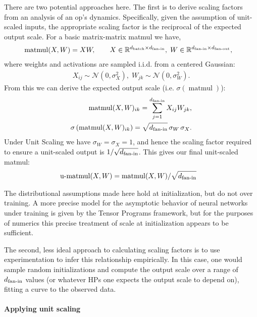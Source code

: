 There are two potential approaches here. The first is to derive scaling factors from an analysis of an op's dynamics. Specifically, given the assumption of unit-scaled inputs, the appropriate scaling factor is the reciprocal of the expected output scale. For a basic matrix-matrix matmul we have,
\begin{align*}
    &\operatorname{matmul}(X, W) = XW, \quad\quad X \in \mathbb{R}^{d_\mathrm{batch} \times d_{\mathrm{fan{\text -}in}}},\; W \in \mathbb{R}^{d_{\mathrm{fan{\text -}in}} \times d_{\mathrm{fan{\text -}out}}},
\end{align*}
where weights and activations are sampled i.i.d. from a centered Gaussian:
\begin{align*}
    X_{ij} \sim \mathcal{N}(0, \sigma_X^2), \; W_{jk} \sim \mathcal{N}(0, \sigma_W^2).
\end{align*}
From this we can derive the expected output scale (i.e. $\sigma(\operatorname{matmul})$):
\begin{align*}
    \operatorname{matmul}(X, W)_{ik} = \sum_{j=1}^{d_{\mathrm{fan{\text -}in}}} X_{ij}W_{jk},
    \\
    \sigma\left(\operatorname{matmul}(X, W)_{ik} \right) = \sqrt{d_{\mathrm{fan{\text -}in}}} \, \sigma_W \, \sigma_X.
\end{align*}
Under Unit Scaling we have $\sigma_W = \sigma_X = 1$, and hence the scaling factor required to ensure a unit-scaled output is $1/\sqrt{d_{\mathrm{fan{\text -}in}}}$. This gives our final unit-scaled matmul:
\begin{align*}
    &\operatorname{u-matmul}(X, W) = \operatorname{matmul}(X, W) / \sqrt{d_{\mathrm{fan{\text -}in}}}
\end{align*}

The distributional assumptions made here hold at initialization, but do not over training. A more precise model for the asymptotic behavior of neural networks under training is given by the Tensor Programs framework, but for the purposes of numerics this precise treatment of scale at initialization appears to be sufficient.

The second, less ideal approach to calculating scaling factors is to use experimentation to infer this relationship empirically. In this case, one would sample random initializations and compute the output scale over a range of $d_{\mathrm{fan{\text -}in}}$ values (or whatever HPs one expects the output scale to depend on), fitting a curve to the observed data.

\paragraph{Applying unit scaling} 

